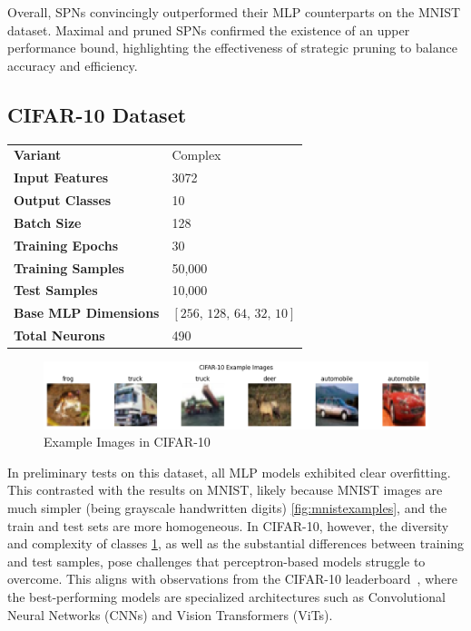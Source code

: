 Overall, SPNs convincingly outperformed their MLP counterparts on the MNIST dataset. Maximal and pruned SPNs confirmed the existence of an upper performance bound, highlighting the effectiveness of strategic pruning to balance accuracy and efficiency.

\subsection{CIFAR-10 Dataset}

\begin{tabular}{@{}ll@{}}
\textbf{Variant} & Complex \\
\textbf{Input Features} & 3072 \\
\textbf{Output Classes} & 10 \\
\textbf{Batch Size} & 128 \\
\textbf{Training Epochs} & 30 \\
\textbf{Training Samples} & 50,000 \\
\textbf{Test Samples} & 10,000 \\
\textbf{Base MLP Dimensions} & $[256,\, 128,\, 64,\, 32,\, 10]$ \\
\textbf{Total Neurons} & 490 \\
\end{tabular}

\begin{figure}[H]
    \centering
    \includegraphics[width=1.0\textwidth]{Figures/Results/CIFAR_10/examples.png} 
    \captionsetup{justification=centering}  %
    \caption{Example Images in CIFAR-10}
    \label{fig:cifarexamples}
\end{figure}

In preliminary tests on this dataset, all MLP models exhibited clear overfitting. This contrasted with the results on MNIST, likely because MNIST images are much simpler (being grayscale handwritten digits) \ref{fig:mnistexamples}, and the train and test sets are more homogeneous. In CIFAR-10, however, the diversity and complexity of classes \ref{fig:cifarexamples}, as well as the substantial differences between training and test samples, pose challenges that perceptron-based models struggle to overcome. This aligns with observations from the CIFAR-10 leaderboard~\cite{pwc_cifar10_leaderboard}, where the best-performing models are specialized architectures such as Convolutional Neural Networks (CNNs) and Vision Transformers (ViTs).

